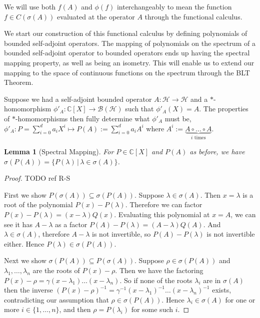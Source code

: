 \documentclass[12pt,oneside]{report}
\newtheorem{lem}[thm]{Lemma}
\begin{document}
We will use both $f(A)$ and $\phi(f)$ interchangeably to mean the function $f \in C(\sigma(A))$ evaluated at the operator $A$ through the functional calculus.

We start our construction of this functional calculus by defining polynomials of bounded self-adjoint operators. The mapping of polynomials on the spectrum of a bounded self-adjoint operator to bounded operators ends up having the spectral mapping property, as well as being an isometry. This will enable us to extend our mapping to the space of continuous functions on the spectrum through the BLT Theorem.

Suppose we had a self-adjoint bounded operator $A: \mathscr{H} \to \mathscr{H}$ and a $*$-homomorphism $\phi'_{A}: \mathbb{C}[X] \to \mathscr{B}(\mathscr{H})$ such that $\phi'_{A}(X) = A$. The properties of $*$-homomorphisms then fully determine what $\phi'_{A}$ must be, $\phi'_{A}: P = \sum_{i=0}^{d} a_{i} X^{i} \mapsto P(A) := \sum_{i=0}^{d} a_{i} A^{i}$ where $A^{i} := \underbrace{ A \circ \dots \circ A }_{ i \text{ times} }$.

\begin{lem}[Spectral Mapping]\label{spectral-mapping-polyn}
    For $P \in \mathbb{C}[X]$ and $P(A)$ as before, we have $\sigma(P(A)) = \{ P(\lambda) \, | \, \lambda \in \sigma(A) \}$.
\end{lem}
\begin{proof}
    TODO ref R-S

    First we show $P(\sigma(A)) \subseteq \sigma(P(A))$. Suppose $\lambda \in \sigma(A)$. Then $x = \lambda$ is a root of the polynomial $P(x) - P(\lambda)$. Therefore we can factor $P(x) - P(\lambda) = (x - \lambda)Q(x)$. Evaluating this polynomial at $x = A$, we can see it has $A - \lambda$ as a factor $P(A) - P(\lambda) = (A - \lambda)Q(A)$. And $\lambda \in \sigma(A)$, therefore $A - \lambda$ is not invertible, so $P(A) - P(\lambda)$ is not invertible either. Hence $P(\lambda) \in \sigma(P(A))$.

    Next we show $\sigma(P(A)) \subseteq P(\sigma(A))$. Suppose $\rho \in \sigma(P(A))$ and $\lambda_{1},\dots,\lambda_{n}$ are the roots of $P(x) - \rho$. Then we have the factoring $P(x) - \rho = \gamma(x - \lambda_{1})\dots(x - \lambda_{n})$. So if none of the roots $\lambda_{i}$ are in $\sigma(A)$ then the inverse $(P(x) - \rho)^{-1} = \gamma^{-1}(x - \lambda_{1})^{-1}\dots(x - \lambda_{n})^{-1}$ exists, contradicting our assumption that $\rho \in \sigma(P(A))$. Hence $\lambda_{i} \in \sigma(A)$ for one or more $i \in \{ 1,\dots,n \}$, and then $\rho = P(\lambda_{i})$ for some such $i$.
\end{proof}
\end{document}
